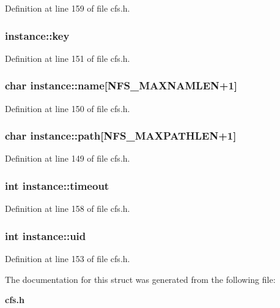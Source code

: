 Definition at line 159 of file cfs.h.
\subsubsection{ {\bf instance::key}}\label{structinstance_o3}




Definition at line 151 of file cfs.h.
\subsubsection{\setlength{\rightskip}{0pt plus 5cm}char {\bf instance::name}[NFS\_\-MAXNAMLEN+1]}\label{structinstance_o2}




Definition at line 150 of file cfs.h.
\subsubsection{\setlength{\rightskip}{0pt plus 5cm}char {\bf instance::path}[NFS\_\-MAXPATHLEN+1]}\label{structinstance_o1}




Definition at line 149 of file cfs.h.
\subsubsection{\setlength{\rightskip}{0pt plus 5cm}int {\bf instance::timeout}}\label{structinstance_o9}




Definition at line 158 of file cfs.h.
\subsubsection{\setlength{\rightskip}{0pt plus 5cm}int {\bf instance::uid}}\label{structinstance_o5}




Definition at line 153 of file cfs.h.

The documentation for this struct was generated from the following file:\begin{CompactItemize}
\item 
{\bf cfs.h}\end{CompactItemize}
